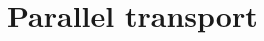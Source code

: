 \documentclass[a4paper,11pt]{article}
\theoremstyle{definition} %
\theoremstyle{plain} %
\theoremstyle{remark} %
\begin{document}
% 

% 

% 

% 

% 

% 

\setcounter{section}{22}
\section{Parallel transport}

\newpage





\end{document}
